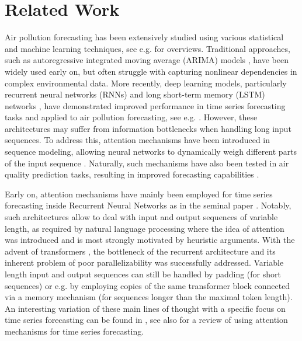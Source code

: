 \section{Related Work}
\label{sec:related_work}
Air pollution forecasting has been extensively studied using various statistical and machine learning techniques, see e.g. \cite{bellinger2017, ijerph15040780, Mendez2023, Houdou_2024} for overviews. Traditional approaches, such as autoregressive integrated moving average (ARIMA) models \cite{box1976time}, have been widely used early on, but often struggle with capturing nonlinear dependencies in complex environmental data. More recently, deep learning models, particularly recurrent neural networks (RNNs) and long short-term memory (LSTM) networks \cite{hochreiter1997long, greff2017lstm}, have demonstrated improved performance in time series forecasting tasks and applied to air pollution forecasting, see e.g. \cite{bui2018deeplearningapproachforecasting, su12062570, 8675934, 8784234}. 
However, these architectures may suffer from information bottlenecks when handling long input sequences. To address this, attention mechanisms have been introduced in sequence modeling, allowing neural networks to dynamically weigh different parts of the input sequence \cite{bahdanau2016neuralmachinetranslationjointly, luong-etal-2015-effective, Vaswani2017AttentionIA, Choromanski2020RethinkingAW}. Naturally, such mechanisms have also been tested in air quality prediction tasks, resulting in improved forecasting capabilities \cite{8614140, 9466491, rana2024, pranolo2024}.

Early on, attention mechanisms have mainly been employed for time series forecasting inside Recurrent Neural Networks as in the seminal paper \cite{bahdanau2016neuralmachinetranslationjointly}. 
Notably, such architectures allow to deal with input and output sequences of variable length, as required by natural language processing where the idea of attention was introduced and is most strongly motivated by heuristic arguments. 
With the advent of transformers \cite{Vaswani2017AttentionIA}, the bottleneck of the recurrent architecture and its inherent problem of poor parallelizability was successfully addressed. Variable length input and output sequences can still be handled by padding (for short sequences) or e.g. by employing copies of the same transformer block connected via a memory mechanism (for sequences longer than the maximal token length). 
An interesting variation of these main lines of thought with a specific focus on time series forecasting can be found in \cite{niu2024attentionrobustrepresentationtime}, see also \cite{kim2024selfattentionseffectivetimeseries} for a review of using attention mechanisms for time series forecasting. 


